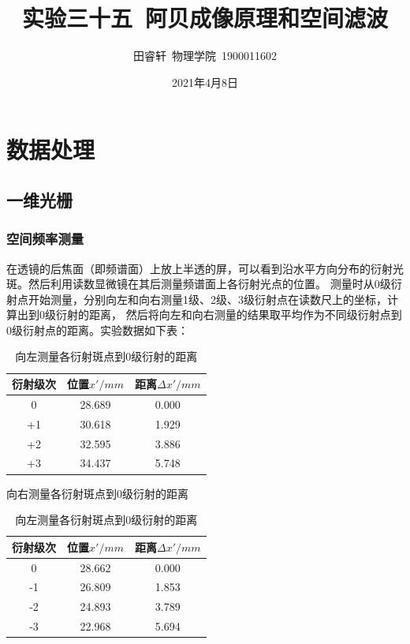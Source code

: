 \documentclass{article}
\title{\heiti 实验三十五\  阿贝成像原理和空间滤波}
\author{\kaishu 田睿轩\ 物理学院\ 1900011602}
\date{2021年4月8日}
\begin{document}
    \maketitle
    \section{数据处理}
    \subsection{一维光栅}
    \subsubsection{空间频率测量}
    在透镜的后焦面（即频谱面）上放上半透的屏，可以看到沿水平方向分布的衍射光斑。然后利用读数显微镜在其后测量频谱面上各衍射光点的位置。
    测量时从0级衍射点开始测量，分别向左和向右测量1级、2级、3级衍射点在读数尺上的坐标，计算出到0级衍射的距离，
    然后将向左和向右测量的结果取平均作为不同级衍射点到0级衍射点的距离。实验数据如下表：
    \begin{table}[h]
        \begin{minipage}{0.49\textwidth}
            \centering
            \begin{tabular}{|c|c|c|}
                \hline
                衍射级次 & 位置$x'/mm$ & 距离$\Delta x'/mm$ \\
                \hline
                0 & 28.689 & 0.000 \\
                \hline
                +1 & 30.618 & 1.929 \\
                \hline
                +2 & 32.595 & 3.886 \\
                \hline
                +3 & 34.437 & 5.748 \\
                \hline
            \end{tabular}
            \caption{向右测量各衍射斑点到0级衍射的距离}
        \end{minipage}
        \begin{minipage}{0.49\textwidth}
            \centering
            \begin{tabular}{|c|c|c|}
                \hline
                衍射级次 & 位置$x'/mm$ & 距离$\Delta x'/mm$ \\
                \hline
                0 &  28.662  & 0.000 \\
                \hline
                -1 & 26.809 & 1.853 \\
                \hline
                -2 & 24.893 & 3.789 \\
                \hline
                -3 & 22.968 & 5.694 \\
                \hline
            \end{tabular}
            \caption{向左测量各衍射斑点到0级衍射的距离}
        \end{minipage}
    \end{table}
\end{document}
